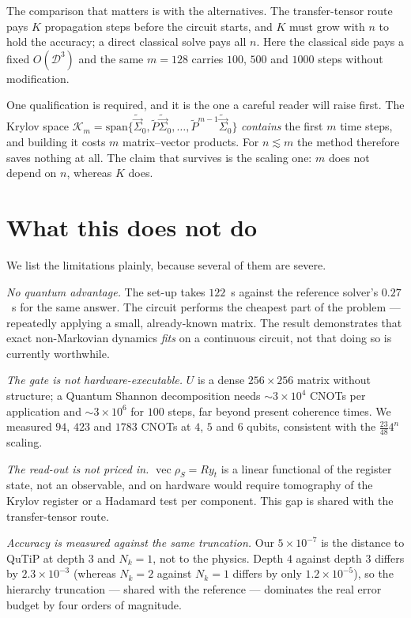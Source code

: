 \documentclass[aps,prx,twocolumn,superscriptaddress,nofootinbib,longbibliography]{revtex4-2}
\theoremstyle{plain}
\newcommand{\vecop}{\operatorname{vec}}
\begin{document}
The comparison that matters is with the alternatives.  The transfer-tensor route
pays $K$ propagation steps before the circuit starts, and $K$ must grow with $n$
to hold the accuracy; a direct classical solve pays all $n$.  Here the classical
side pays a fixed $O(\mathcal D^3)$ and the same $m=128$ carries $100$, $500$ and
$1000$ steps without modification.

One qualification is required, and it is the one a careful reader will raise
first.  The Krylov space
$\mathcal K_m=\mathrm{span}\{\tilde{\vec\Sigma}_0,\tilde P\tilde{\vec\Sigma}_0,
\dots,\tilde P^{m-1}\tilde{\vec\Sigma}_0\}$ \emph{contains} the first $m$ time
steps, and building it costs $m$ matrix--vector products.  For $n\lesssim m$ the
method therefore saves nothing at all.  The claim that survives is the scaling
one: $m$ does not depend on $n$, whereas $K$ does.

\section{What this does not do}
\label{sec:limits}

We list the limitations plainly, because several of them are severe.

\emph{No quantum advantage.}  The set-up takes $122$~s against the reference
solver's $0.27$~s for the same answer.  The circuit performs the cheapest part of
the problem --- repeatedly applying a small, already-known matrix.  The result
demonstrates that exact non-Markovian dynamics \emph{fits} on a continuous
circuit, not that doing so is currently worthwhile.

\emph{The gate is not hardware-executable.}  $U$ is a dense $256\times256$
matrix without structure; a Quantum Shannon decomposition \cite{Shende2006}
needs $\sim\!3\times10^{4}$ CNOTs per application and $\sim\!3\times10^{6}$ for
$100$ steps, far beyond present coherence times.  We measured $94$, $423$ and
$1783$ CNOTs at $4$, $5$ and $6$ qubits, consistent with the $\tfrac{23}{48}4^{n}$
scaling.

\emph{The read-out is not priced in.}  $\vecop\rho_S=Ry_t$ is a linear functional
of the register state, not an observable, and on hardware would require
tomography of the Krylov register or a Hadamard test per component.  This gap is
shared with the transfer-tensor route.

\emph{Accuracy is measured against the same truncation.}  Our $5\times10^{-7}$ is
the distance to QuTiP at depth $3$ and $N_k=1$, not to the physics.  Depth $4$
against depth $3$ differs by $2.3\times10^{-3}$ (whereas $N_k=2$ against $N_k=1$
differs by only $1.2\times10^{-5}$), so the hierarchy truncation --- shared with
the reference --- dominates the real error budget by four orders of magnitude.
\end{document}
